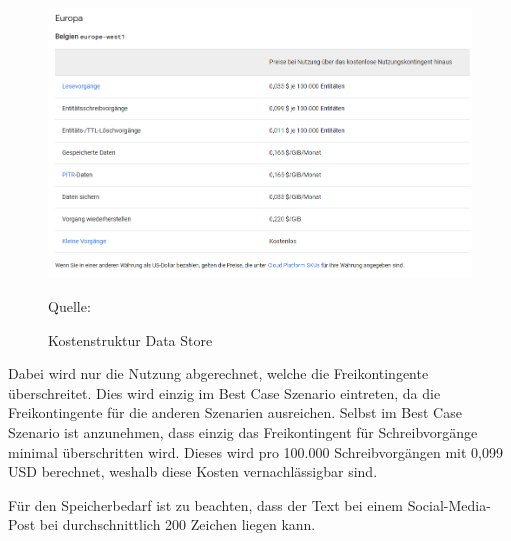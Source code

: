 \begin{figure}[htbp]
    \includegraphics[width=\textwidth, height=\textheight, keepaspectratio]{abbildungen/kostendatastore}
    \caption{Kostenstruktur Data Store}
    \label{fig:KostenDataStore}
    \raggedright Quelle:\cite{GoogleDatastorePricing2025}
\end{figure}


Dabei wird nur die Nutzung abgerechnet, welche die Freikontingente überschreitet.
Dies wird einzig im Best Case Szenario eintreten, da die Freikontingente für die anderen Szenarien ausreichen.
Selbst im Best Case Szenario ist anzunehmen, dass einzig das Freikontingent für Schreibvorgänge minimal überschritten wird.
Dieses wird pro 100.000 Schreibvorgängen mit 0,099 USD berechnet, weshalb diese Kosten vernachlässigbar sind.

Für den Speicherbedarf ist zu beachten, dass der Text bei einem Social-Media-Post bei durchschnittlich 200 Zeichen liegen kann.

